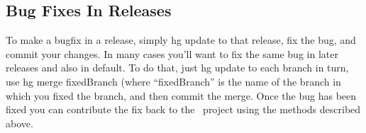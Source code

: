 \subsection{Bug Fixes In Releases}

To make a bugfix in a release, simply {\normalfont \ttfamily hg update} to that release, fix the bug, and commit your changes. In many cases you'll want to fix the same bug in later releases and also in {\normalfont \ttfamily default}. To do that, just {\normalfont \ttfamily hg update} to each branch in turn, use {\normalfont \ttfamily hg merge fixedBranch} (where ``{\normalfont \ttfamily fixedBranch}'' is the name of the branch in which you fixed the branch, and then commit the merge. Once the bug has been fixed you can contribute the fix back to the \glc\ project using the methods described above.
